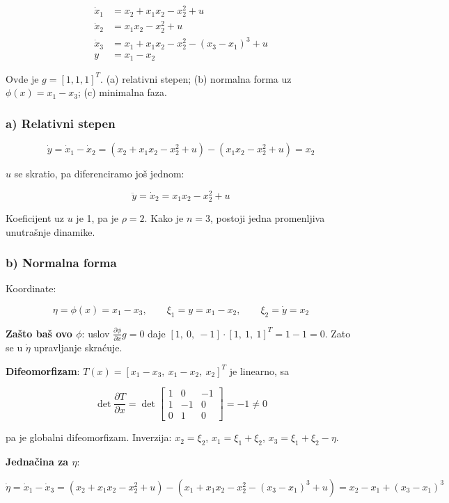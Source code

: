 \documentclass[11pt,a4paper,parskip=half,headsepline,numbers=noenddot]{scrartcl}
\begin{document}
\[
\begin{aligned}
\dot x_1 &= x_2 + x_1x_2 - x_2^2 + u \\
\dot x_2 &= x_1x_2 - x_2^2 + u \\
\dot x_3 &= x_1 + x_1x_2 - x_2^2 - (x_3 - x_1)^3 + u \\
y &= x_1 - x_2
\end{aligned}
\]

Ovde je \(g = [1, 1, 1]^T\). (a) relativni stepen; (b) normalna forma uz \(\phi(x) = x_1 - x_3\); (c) minimalna faza.

\subsubsection{a) Relativni stepen}

\[\dot y = \dot x_1 - \dot x_2 = (x_2 + x_1x_2 - x_2^2 + u) - (x_1x_2 - x_2^2 + u) = x_2\]

\(u\) se skratio, pa diferenciramo još jednom:

\[\ddot y = \dot x_2 = x_1x_2 - x_2^2 + u\]

Koeficijent uz \(u\) je 1, pa je \(\rho = 2\). Kako je \(n = 3\), postoji jedna promenljiva unutrašnje dinamike.

\subsubsection{b) Normalna forma}

Koordinate:

\[\eta = \phi(x) = x_1 - x_3, \qquad \xi_1 = y = x_1 - x_2, \qquad \xi_2 = \dot y = x_2\]

\textbf{Zašto baš ovo \(\phi\)}: uslov \(\frac{\partial\phi}{\partial x}g = 0\) daje \([1,\ 0,\ -1]\cdot[1,\ 1,\ 1]^T = 1 - 1 = 0\). Zato se u \(\dot\eta\) upravljanje skraćuje.

\textbf{Difeomorfizam}: \(T(x) = [x_1 - x_3,\ x_1 - x_2,\ x_2]^T\) je linearno, sa

\[\det\frac{\partial T}{\partial x} = \det\begin{bmatrix} 1 & 0 & -1 \\ 1 & -1 & 0 \\ 0 & 1 & 0 \end{bmatrix} = -1 \ne 0\]

pa je globalni difeomorfizam. Inverzija: \(x_2 = \xi_2\), \(x_1 = \xi_1 + \xi_2\), \(x_3 = \xi_1 + \xi_2 - \eta\).

\textbf{Jednačina za \(\eta\)}:

\[\dot\eta = \dot x_1 - \dot x_3 = (x_2 + x_1x_2 - x_2^2 + u) - (x_1 + x_1x_2 - x_2^2 - (x_3 - x_1)^3 + u) = x_2 - x_1 + (x_3 - x_1)^3\]
\end{document}
